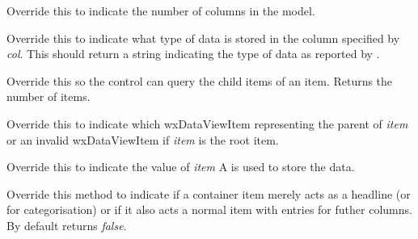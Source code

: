 \label{wxdataviewmodelgetcolumncount}


Override this to indicate the number of columns in the model.

\label{wxdataviewmodelgetcolumntype}


Override this to indicate what type of data is stored in the
column specified by {\it col}. This should return a string
indicating the type of data as reported by .

\label{wxdataviewmodelgetchildren}


Override this so the control can query the child items of
an item. Returns the number of items.

\label{wxdataviewmodelgetparent}


Override this to indicate which wxDataViewItem representing the parent
of {\it item} or an invalid wxDataViewItem if {\it item} is the root item.

\label{wxdataviewmodelgetvalue}


Override this to indicate the value of {\it item}
A  is used to store the data.


\label{wxdataviewmodelhascontainercolumns}


Override this method to indicate if a container item merely
acts as a headline (or for categorisation) or if it also
acts a normal item with entries for futher columns. By 
default returns {\it false}.

\label{wxdataviewmodelhasdefaultcompare}

